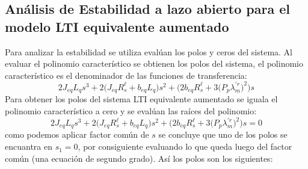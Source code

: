 \documentclass[blue,fullpaper]{ludusofficial}  %
\begin{document}
\subsection{Análisis de Estabilidad a lazo abierto para el modelo LTI equivalente aumentado}
Para analizar la estabilidad se utiliza evalúan los polos y ceros del sistema. Al evaluar el polinomio característico se obtienen los polos del sistema, el polinomio característico es el denominador de las funciones de transferencia:
\begin{equation}
\label{eq:polinomio-la}
    2J_{eq}L_qs^3+2\Big(J_{eq}R_s^\ell+b_{eq}L_q\Big)s^2+\Big(2b_{eq}R_s^\ell+3\Big(P_p\lambda^{'r}_m\Big)^2\Big)s
\end{equation}
Para obtener los polos del sistema LTI equivalente aumentado se iguala el polinomio característico a cero y se evalúan las raíces del polinomio:
\begin{equation*}
    2J_{eq}L_qs^3+2\Big(J_{eq}R_s^\ell+b_{eq}L_q\Big)s^2+\Big(2b_{eq}R_s^\ell+3\Big(P_p\lambda^{'r}_m\Big)^2\Big)s=0
\end{equation*}
como podemos aplicar factor común de $s$ se concluye que uno de los polos se encuantra en $s_1=0$, por consiguiente evaluando lo que queda luego del factor común (una ecuación de segundo grado). Así los polos son los siguientes: 
\end{document}
